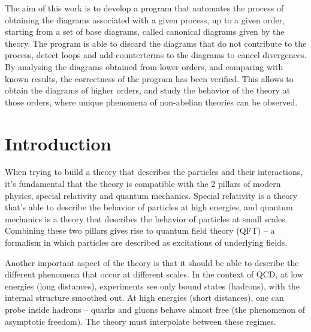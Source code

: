 \documentclass[11pt,a4paper,twoside,pdf]{article}
\numberwithin{equation}{section}
\begin{document}
\begin{center}
\begin{minipage}{0.8\linewidth}
The aim of this work is to develop a program that automates the process of
obtaining the diagrams associated with a given process, up to a given order,
starting from a set of base diagrams, called canonical diagrams given by the
theory. The program is able to discard the diagrams that do not contribute to the
process, detect loops and add counterterms to the diagrams to cancel divergences. \\

By analysing the diagrams obtained from lower orders, and comparing with known
results, the correctness of the program has been verified. This allows to obtain
the diagrams of higher orders, and study the behavior of the theory at those
orders, where unique phenomena of non-abelian theories can be observed.

\end{minipage}

\newpage

\end{center}


\pagestyle{empty}       %
\tableofcontents
\setcounter{page}{0}
\cleardoublepage        %


\pagestyle{fancy}
\fancyhead[RO,LE]{\leftmark}
\fancyhead[LO,RE]{\thepage}
\fancyfoot{}

\newpage

\section{Introduction}

When trying to build a theory that describes the particles and their interactions, 
it's fundamental that the theory is compatible with the 2 pillars of modern physics,
special relativity and quantum mechanics. Special relativity is a theory 
that's able to describe the behavior of particles at high energies, and quantum 
mechanics is a theory that describes the behavior of particles at small scales.
Combining these two pillars gives rise to quantum field theory (QFT) – a formalism 
in which particles are described as excitations of underlying fields.

Another important aspect of the theory is that it should be able to describe the 
different phenomena that occur at different scales. In the context of QCD, at low 
energies (long distances), experiments see only bound states (hadrons), with the 
internal structure smoothed out. At high energies (short distances), one can probe 
inside hadrons – quarks and gluons behave almost free (the phenomenon of 
asymptotic freedom). The theory must interpolate between these regimes.
\end{document}
